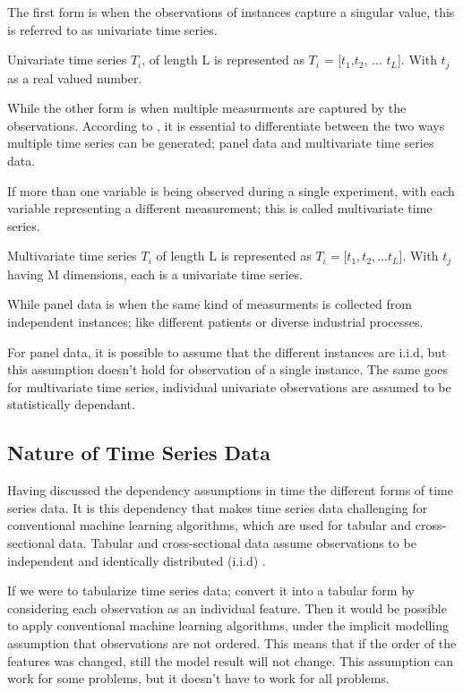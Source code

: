 The first form is when the observations of instances capture a singular value, this is referred to as univariate time series.
\begin{definition}
    Univariate time series $T_{i}$, of length L is represented as 
    $T_{i}$ = [$t_{1}$,$t_{2}$, $\ldots$ $t_{L}$].
    With $t_{j}$ as a real valued number.
\end{definition}
While the other form is when multiple measurments are captured by the observations.
According to \cite{loning2019sktime}, it is essential to differentiate between the two ways multiple time series can be generated; panel data and multivariate time series data.

If more than one variable is being observed during a single experiment, with each variable representing a different measurement; this is called multivariate time series.
\begin{definition}
    Multivariate time series $T_{i}$ of length L is represented as $T_{i} = [t_{1},t_{2},\ldots t_{L}$].
    With $t_{j}$ having M dimensions, each is a univariate time series.
\end{definition}
While panel data is when the same kind of measurments is collected from independent instances; like different patients or diverse industrial processes.

For panel data, it is possible to assume that the different instances are i.i.d, but this assumption doesn't hold for observation of a single instance.
The same goes for multivariate time series, individual univariate observations are assumed to be statistically dependant.

\subsection{Nature of Time Series Data}
\label{NatureOfTimeSeriesData}
Having discussed the dependency assumptions in time the different forms of time series data.
It is this dependency that makes time series data challenging for conventional machine learning algorithms, which are used for tabular and cross-sectional data.
Tabular and cross-sectional data assume observations to be independent and identically distributed (i.i.d) \cite{loning2019sktime}.

If we were to tabularize time series data; convert it into a tabular form by considering each observation as an individual feature.
Then it would be possible to apply conventional machine learning algorithms, under the implicit modelling assumption that observations are not ordered.
This means that if the order of the features was changed, still the model result will not change.
This assumption can work for some problems, but it doesn't have to work for all problems.

